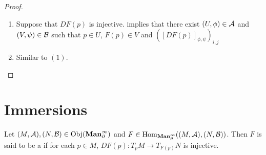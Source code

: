 \documentclass{book}
\begin{document}
	\begin{proof}\
		\begin{enumerate}
			\item Suppose that $DF(p)$ is injective.  implies that there exist $(U, \phi) \in \mathcal{A}$ and $(V, \psi) \in \mathcal{B}$ such that $p \in U$, $F(p) \in V$ and $([DF(p)]_{\phi, \psi})_{i,j}$
			\item Similar to $(1)$. 
		\end{enumerate}
	\end{proof}





































































	
	
	
	
	
	
	
	
	
	
	
	
	\newpage
	\section{Immersions}
	
	\begin{defn} 
		Let $(M, \mathcal{A}), (N, \mathcal{B}) \in \operatorname{Obj}(\operatorname*{\text{\textbf{Man}}^{\infty}_{\partial}})$ and $F \in \operatorname{Hom}_{\operatorname*{\text{\textbf{Man}}^{\infty}_{\partial}}}((M, \mathcal{A}), (N, \mathcal{B}))$. Then $F$ is said to be a  if for each $p \in M$, $DF(p):T_pM\rightarrow T_{F(p)}N$ is injective.
	\end{defn}
\end{document}
